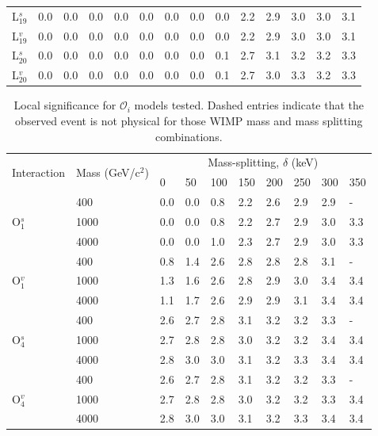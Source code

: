 \begin{table}[ht]
\begin{tabular}{l|lllllllllllll}
    L$^s_{19}$ & 0.0 & 0.0 & 0.0 & 0.0 & 0.0 & 0.0 & 0.0 & 0.0 & 2.2 & 2.9 & 3.0 & 3.0 & 3.1 \\
    L$^v_{19}$ & 0.0 & 0.0 & 0.0 & 0.0 & 0.0 & 0.0 & 0.0 & 0.0 & 2.2 & 2.9 & 3.0 & 3.0 & 3.1 \\
    L$^s_{20}$ & 0.0 & 0.0 & 0.0 & 0.0 & 0.0 & 0.0 & 0.0 & 0.1 & 2.7 & 3.1 & 3.2 & 3.2 & 3.3 \\
    L$^v_{20}$ & 0.0 & 0.0 & 0.0 & 0.0 & 0.0 & 0.0 & 0.0 & 0.1 & 2.7 & 3.0 & 3.3 & 3.2 & 3.3 \\
    \hline
    \hline
    \end{tabular}
    \label{tab:lagrangian_significance}
\end{table}


\begin{table}[ht]
    \centering
    \caption{Local significance for $\mathcal{O}_i$ models tested.
    Dashed entries indicate that the observed event is not physical for those WIMP mass and mass splitting combinations.}
    \begin{tabular}{l|l|llllllll}
    \hline
    \multirow{2}{*}{Interaction} & \multirow{2}{*}{Mass (GeV/c$^2$)} & \multicolumn{8}{c}{Mass-splitting, $\delta$ (keV)} \\
                             &      & 0   & 50 & 100  & 150 & 200 & 250 & 300 & 350 \\
    \hline
    \multirow{3}{*}{O$^s_1$} 
    & 400  & 0.0 & 0.0  & 0.8  & 2.2  & 2.6   & 2.9 & 2.9   & -  \\
    & 1000 & 0.0 & 0.0  & 0.8  & 2.2  & 2.7   & 2.9 & 3.0 & 3.3  \\
    & 4000 & 0.0 & 0.0  & 1.0  & 2.3  & 2.7   & 2.9 & 3.0 & 3.3  \\ \hline
    \multirow{3}{*}{O$^v_1$} 
    & 400  & 0.8 & 1.4 & 2.6 & 2.8 & 2.8 & 2.8 & 3.1 & - \\
    & 1000 & 1.3 & 1.6 & 2.6 & 2.8 & 2.9 & 3.0 & 3.4 & 3.4 \\
    & 4000 & 1.1 & 1.7 & 2.6 & 2.9 & 2.9 & 3.1 & 3.4 & 3.4 \\ \hline
    \multirow{3}{*}{O$^s_4$} 
    & 400  & 2.6 & 2.7 & 2.8 & 3.1 & 3.2 & 3.2 & 3.3 & - \\
    & 1000 & 2.7 & 2.8 & 2.8 & 3.0 & 3.2 & 3.2 & 3.4 & 3.4 \\
    & 4000 & 2.8 & 3.0 & 3.0 & 3.1 & 3.2 & 3.3 & 3.4 & 3.4 \\ \hline
    \multirow{3}{*}{O$^v_4$} 
    & 400  & 2.6 & 2.7 & 2.8 & 3.1 & 3.2 & 3.2 & 3.3 & - \\
    & 1000 & 2.7 & 2.8 & 2.8 & 3.0 & 3.2 & 3.2 & 3.3 & 3.4 \\
    & 4000 & 2.8 & 3.0 & 3.0 & 3.1 & 3.2 & 3.3 & 3.4 & 3.4 \\
    \hline
    \hline
    \end{tabular}
    \label{tab:operator_significance}
\end{table}
